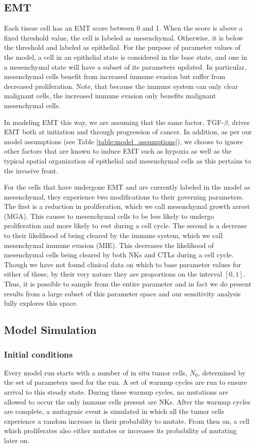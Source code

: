 \documentclass[11pt]{article}
\begin{document}
\subsection{EMT}\label{EMT}
Each tissue cell has an EMT score between 0 and 1.
When the score is above a fixed threshold value, the cell is labeled as mesenchymal.
Otherwise, it is below the threshold and labeled as epithelial.
For the purpose of parameter values of the model, a cell in an epithelial state is considered in the base state, and one in a mesenchymal state will have a subset of its parameters updated.
In particular, mesenchymal cells benefit from increased immune evasion but suffer from decreased proliferation.
Note, that because the immune system can only clear malignant cells, the increased immune evasion only benefits malignant mesenchymal cells.
\par
In modeling EMT this way, we are assuming that the same factor, TGF-$\beta$, drives EMT both at initiation and through progression of cancer.
In addition, as per our model assumptions (see Table \ref{table:model_assumptions}), we choose to ignore other factors that are known to induce EMT such as hypoxia as well as the typical spatial organization of epithelial and mesenchymal cells as this pertains to the invasive front.
\par
For the cells that have undergone EMT and are currently labeled in the model as mesenchymal, they experience two modifications to their governing parameters.
The first is a reduction in proliferation, which we call mesenchymal growth arrest (MGA).
This causes to mesenchymal cells to be less likely to undergo proliferation and more likely to rest during a cell cycle.
The second is a decrease to their likelihood of being cleared by the immune system, which we call mesenchymal immune evasion (MIE). 
This decreases the likelihood of mesenchymal cells being cleared by both NKs and CTLs during a cell cycle.
Though we have not found clinical data on which to base parameter values for either of these, by their very nature they are proportions on the interval $[0,1]$.
Thus, it is possible to sample from the entire parameter and in fact we do present results from a large subset of this parameter space and our sensitivity analysis fully explores this space.

\subsection{Model Simulation}

\subsubsection{Initial conditions} 
Every model run starts with a number of in situ tumor cells, $N_0$, determined by the set of parameters used for the run.
A set of warmup cycles are run to ensure arrival to this steady state.
During these warmup cycles, no mutations are allowed to occur the only immune cells present are NKs.
After the warmup cycles are complete, a mutagenic event is simulated in which all the tumor cells experience a random increase in their probability to mutate.
From then on, a cell which proliferates also either mutates or increases its probability of mutating later on.
\end{document}
